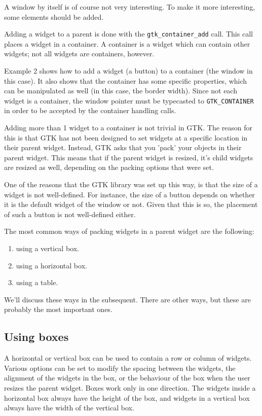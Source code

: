 \documentclass[10pt]{article}
\begin{document}
A window by itself is of course not very interesting. To make it more
interesting, some elements should be added. 

Adding a widget to a parent is done with the \lstinline|gtk_container_add|
call. This call places a widget in a container. A container is a widget 
which can contain other widgets; not all widgets are containers, however.

Example 2 shows how to add a widget (a button) to a container (the window
in this case). It also shows that the container has some specific
properties, which can be manipulated as well (in this case, the border
width). Since not each widget is a container, the window pointer must be
typecasted to \lstinline|GTK_CONTAINER| in order to be accepted by the
container handling calls.



Adding more than 1 widget to a container is not trivial in GTK. The reason
for this is that GTK has not been designed to set widgets at a specific
location in their parent widget. Instead, GTK asks that you 'pack' your
objects in their parent widget. This means that if the parent widget is
resized, it's child widgets are resized as well, depending on the packing
options that were set.

One of the reasons that the GTK library was set up this way, is that the
size of a widget is not well-defined. For instance, the size of a button
depends on whether it is the default widget of the window or not. Given 
that this is so, the placement of such a button is not well-defined either.

The most common ways of packing widgets in a parent widget are the
following:
\begin{enumerate}
\item using a vertical box.
\item using a horizontal box.
\item using a table.
\end{enumerate}
We'll discuss these ways in the subsequent. There are other ways, but these
are probably the most important ones.

\subsection{Using boxes}

A horizontal or vertical box can be used to contain a row or column of
widgets. Various options can be set to modify the spacing between the 
widgets, the alignment of the widgets in the box, or the behaviour of 
the box when the user resizes the parent widget. Boxes work only in 
one direction. The widgets inside a horizontal box always have the height of
the box, and widgets in a vertical box always have the width of the vertical
box.
\end{document}

